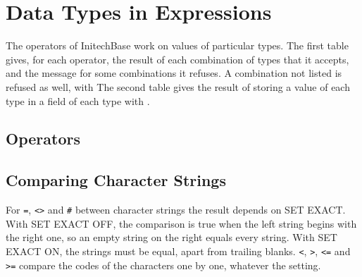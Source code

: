\chapter{Data Types in Expressions}
\NoDictionaryHeads
The operators of InitechBase work on values of particular types.  The first
table gives, for each operator, the result of each combination of types that
it accepts, and the message for some combinations it refuses.  A combination
not listed is refused as well, with   The second
table gives the result of storing a value of each type in a field of each
type with .


\section{Operators}
\begingroup\small

\endgroup


\section{Comparing Character Strings}
For \texttt{=}, \texttt{<>} and \texttt{\#} between character strings the
result depends on SET EXACT.  With SET EXACT OFF, the comparison is true when
the left string begins with the right one, so an empty string on the right
equals every string.  With SET EXACT ON, the strings must be equal, apart from
trailing blanks.  \texttt{<}, \texttt{>}, \texttt{<=} and \texttt{>=} compare the
codes of the characters one by one, whatever the setting.

